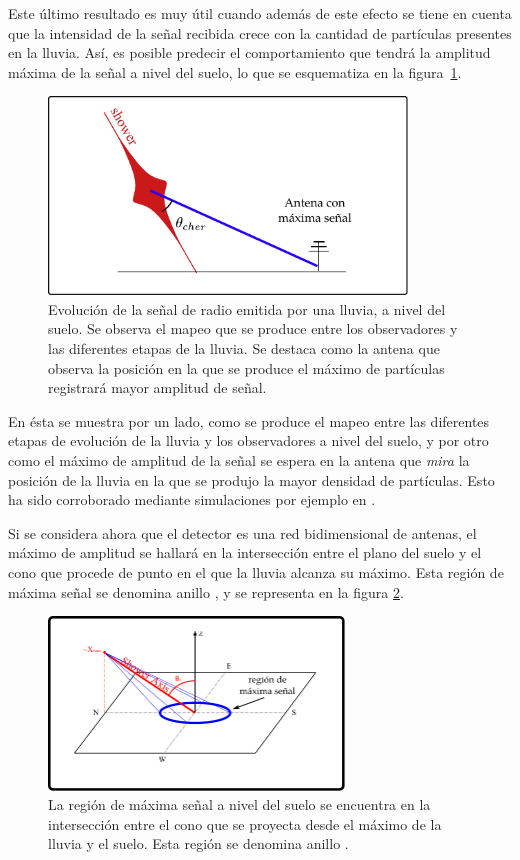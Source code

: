 	Este \'ultimo resultado es muy \'util cuando adem\'as de este efecto se tiene en cuenta que la intensidad de la se\~nal recibida crece con la cantidad de part\'iculas presentes en la lluvia.
	As\'i, es posible predecir el comportamiento que tendr\'a la amplitud m\'axima de la se\~nal a nivel del suelo, lo que se esquematiza en la figura~\ref{fig:cher_emision_2}.
	\begin{figure}[ht!]
		\centering
		\includegraphics[width=0.85\textwidth]{fig/EASRadio/cono}
		\caption{\label{fig:cher_emision_2} Evoluci\'on de la se\~nal de radio emitida por una lluvia, a nivel del suelo. Se observa el mapeo que se produce entre los observadores y las diferentes etapas de la lluvia. Se destaca como la antena que observa la posici\'on en la que se produce el m\'aximo de part\'iculas registrar\'a mayor amplitud de se\~nal.}
	\end{figure}
	En \'esta se muestra por un lado, como se produce el mapeo entre las diferentes etapas de evoluci\'on de la lluvia y los observadores a nivel del suelo, y por otro como el m\'aximo de amplitud de la se\~nal se espera en la antena que \emph{mira} la posici\'on de la lluvia en la que se produjo la mayor densidad de part\'iculas.
	Esto ha sido corroborado mediante simulaciones por ejemplo en \cite{zhairezAir}.
	
	Si se considera ahora que el detector es una red bidimensional de antenas, el m\'aximo de amplitud se hallar\'a en la intersecci\'on entre el plano del suelo y el cono \cher{} que procede de punto en el que la lluvia alcanza su m\'aximo. Esta regi\'on de m\'axima se\~nal se denomina anillo \cher{}, y se representa en la figura \ref{fig:cono}.
	\begin{figure}[ht!]
		\centering
		\includegraphics[width=0.7\textwidth]{fig/EASRadio/chConeSch}
		\caption{\label{fig:cono} La región de máxima señal a nivel del suelo se encuentra en la intersección entre el cono \cher{} que se proyecta desde el máximo de la lluvia y el suelo. Esta regi\'on se denomina anillo \cher{}.}
	\end{figure}
	
